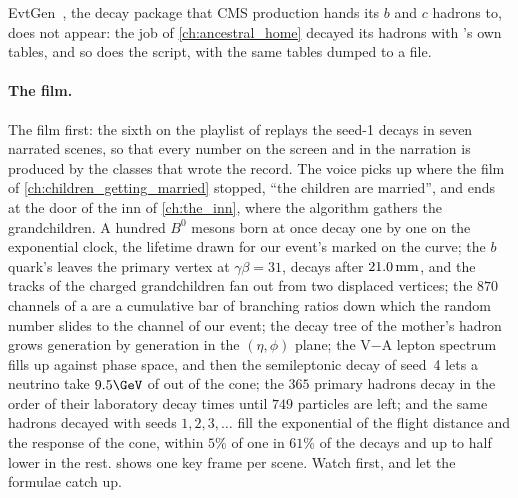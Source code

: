 EvtGen~\cite{Lange:2001uf}, the decay package that CMS production hands its
$b$ and $c$ hadrons to, does not appear: the \CMSSW job of
\cref{ch:ancestral_home} decayed its hadrons with \PYTHIA's own tables, and
so does the script, with the same tables dumped to a file.

\paragraph{The film.}
\label{sec:children_producing_grandchildren:animation}
The film first: the sixth on the playlist of \jitjetworld replays the
seed-1 decays in seven narrated scenes, so that every number on the screen
and in the narration is produced by the classes that wrote the record. The
voice picks up where the film of \cref{ch:children_getting_married}
stopped, ``the children are married'', and ends at the door of the inn of
\cref{ch:the_inn}, where the \antikt algorithm gathers the grandchildren.
A hundred $B^0$ mesons born at once decay one by one on the exponential
clock, the lifetime drawn for our event's \Bbar marked on the curve; the
$b$ quark's \Bbar leaves the primary vertex at $\gamma\beta=31$, decays
after $21.0\,\mathrm{mm}$, and the tracks of the charged grandchildren fan out from
two displaced vertices; the $870$ channels of a \Bbar are a cumulative bar
of branching ratios down which the random number slides to the channel of
our event; the decay tree of the mother's hadron grows generation by
generation in the $(\eta,\phi)$ plane; the V$-$A lepton spectrum fills up
against phase space, and then the semileptonic decay of seed~4 lets a
neutrino take $9.5\GeV$ of \pt out of the cone; the $365$ primary hadrons decay
in the order of their laboratory decay times until $749$ particles are
left; and the same hadrons decayed with seeds $1,2,3,\ldots$ fill the
exponential of the flight distance and the response of the cone, within
$5\%$ of one in $61\%$ of the decays and up to half lower in the rest.
 shows one key frame per scene. Watch first, and let
the formulae catch up.

